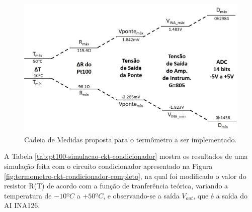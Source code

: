 \documentclass[a4paper]{instrumentacao}
\begin{document}
\begin{figure}[H]
	\centering \includegraphics[width=\textwidth]{termometro-cadeia-medidas-proposta2.jpg}
	\caption{Cadeia de Medidas proposta para o termômetro a ser implementado.}
	\label{fig:termometro-cadeia-medidas-proposta}
\end{figure}

A Tabela \ref{tab:pt100-simulacao-ckt-condicionador} mostra os resultados de uma simulação feita com o circuito condicionador apresentado na Figura \ref{fig:termometro-ckt-condicionador-completo}, na qual foi modificado o valor do resistor R(T) de acordo com a função de tranferência teórica, variando a temperatura de $-10ºC$ a $+50ºC$, e observando-se a saída $V_{out}$, que é a saída do AI INA126.
\end{document}
